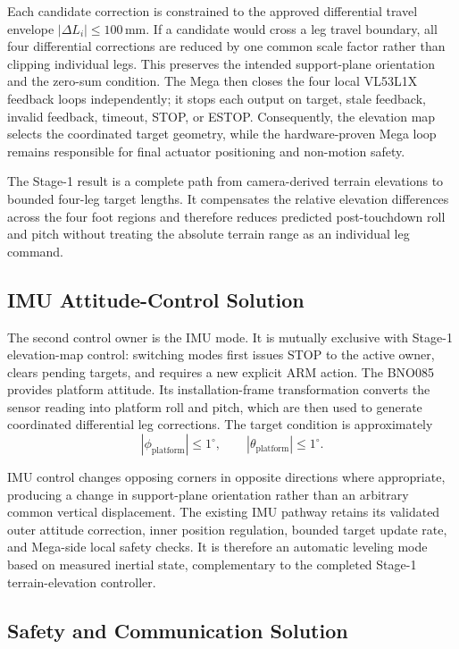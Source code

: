 Each candidate correction is constrained to the approved differential travel envelope $|\Delta L_i|\leq100\,\mathrm{mm}$. If a candidate would cross a leg travel boundary, all four differential corrections are reduced by one common scale factor rather than clipping individual legs. This preserves the intended support-plane orientation and the zero-sum condition. The Mega then closes the four local VL53L1X feedback loops independently; it stops each output on target, stale feedback, invalid feedback, timeout, STOP, or ESTOP. Consequently, the elevation map selects the coordinated target geometry, while the hardware-proven Mega loop remains responsible for final actuator positioning and non-motion safety.

The Stage-1 result is a complete path from camera-derived terrain elevations to bounded four-leg target lengths. It compensates the relative elevation differences across the four foot regions and therefore reduces predicted post-touchdown roll and pitch without treating the absolute terrain range as an individual leg command.

\subsection*{IMU Attitude-Control Solution}

The second control owner is the IMU mode. It is mutually exclusive with Stage-1 elevation-map control: switching modes first issues STOP to the active owner, clears pending targets, and requires a new explicit ARM action. The BNO085 provides platform attitude. Its installation-frame transformation converts the sensor reading into platform roll and pitch, which are then used to generate coordinated differential leg corrections. The target condition is approximately
\[
|\phi_{\mathrm{platform}}|\leq1^\circ,
\qquad
|\theta_{\mathrm{platform}}|\leq1^\circ.
\]

IMU control changes opposing corners in opposite directions where appropriate, producing a change in support-plane orientation rather than an arbitrary common vertical displacement. The existing IMU pathway retains its validated outer attitude correction, inner position regulation, bounded target update rate, and Mega-side local safety checks. It is therefore an automatic leveling mode based on measured inertial state, complementary to the completed Stage-1 terrain-elevation controller.

\subsection*{Safety and Communication Solution}

